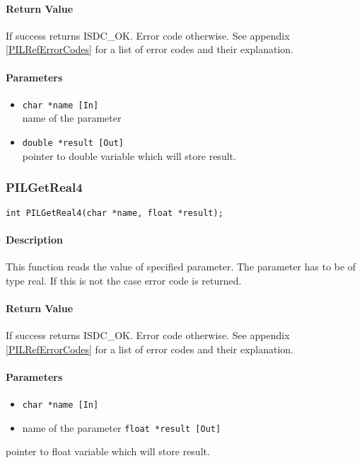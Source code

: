 \paragraph{Return Value\\}
If success returns ISDC\_OK. Error code otherwise. See appendix \ref{PILRefErrorCodes}
for a list of error codes and their explanation.

\paragraph{Parameters}
\begin{itemize}
\item
{\tt char *name [In]} \\
name of the parameter
\item
{\tt double *result [Out]} \\
pointer to double variable which will store result. 
\end{itemize}



\subsubsection{PILGetReal4}

\begin{verbatim}
int PILGetReal4(char *name, float *result);
\end{verbatim}

\paragraph{Description\\}
This function reads the value of specified parameter. The parameter has to
be of type real. If this is not the case
error code is returned. 

\paragraph{Return Value\\}
If success returns ISDC\_OK. Error code otherwise. See appendix \ref{PILRefErrorCodes}
for a list of error codes and their explanation.

\paragraph{Parameters}
\begin{itemize}
\item
{\tt char *name [In] } \\
\item
name of the parameter 
{\tt float *result [Out] } \\
\end{itemize}
pointer to float variable which will store result.
